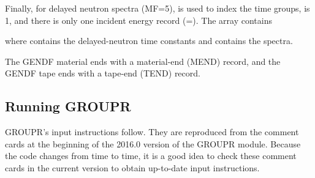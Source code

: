 Finally, for delayed neutron spectra (MF=5),  is used to index
the time groups,  is 1, and there is only one incident energy
record (=).  The array  contains

\indent {}

\noindent where  contains the delayed-neutron time constants
and  contains the spectra.

The GENDF material ends with a material-end (MEND) record, and the GENDF
tape ends with a tape-end (TEND) record.

\subsection{Running GROUPR}
\label{ssGROUPR_RunningGROUPR}

GROUPR's input instructions follow.  They are reproduced from the comment
cards at the beginning of the
2016.0
version of the GROUPR module.
Because the code changes from time to time, it is a good idea to
check these comment cards in the current version to obtain
up-to-date input instructions.

